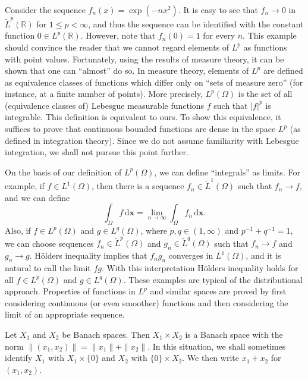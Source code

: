 \begin{Remark}
\label{rem:lp-point-values-and-measure-zero}
Consider the sequence $f_n(x)=\exp(-nx^2)$. It is easy to see that $f_n\to0$ in $\widetilde L^p(\mathbb{R})$ for $1\leq p<\infty$, and thus the sequence can be identified with the constant function $0\in L^p(\mathbb{R})$. However, note that $f_n(0)=1$ for every $n$. This example should convince the reader that we cannot regard elements of $L^p$ as functions with point values. Fortunately, using the results of measure theory, it can be shown that one can ``almost'' do so. In measure theory, elements of $L^p$ are defined as equivalence classes of functions which differ only on ``sets of measure zero'' (for instance, at a finite number of points). More precisely, $L^p(\Omega)$ is the set of all (equivalence classes of) Lebesgue measurable functions $f$ such that $|f|^p$ is integrable. This definition is equivalent to ours. To show this equivalence, it suffices to prove that continuous bounded functions are dense in the space $L^p$ (as defined in integration theory). Since we do not assume familiarity with Lebesgue integration, we shall not pursue this point further.
\end{Remark}

On the basis of our definition of $L^p(\Omega)$, we can define ``integrals'' as limits. For example, if $f\in L^1(\Omega)$, then there is a sequence $f_n\in\widetilde L^1(\Omega)$ such that $f_n\to f$, and we can define
\begin{equation}\label{eq:lp-completion-integral-definition}
\int_\Omega f\,\mathrm{d}\bm{x}=\lim_{n\to\infty}\int_\Omega f_n\,\mathrm{d}\bm{x}.
\end{equation}
Also, if $f\in L^p(\Omega)$ and $g\in L^q(\Omega)$, where $p,q\in(1,\infty)$ and $p^{-1}+q^{-1}=1$, we can choose sequences $f_n\in\widetilde L^p(\Omega)$ and $g_n\in\widetilde L^q(\Omega)$ such that $f_n\to f$ and $g_n\to g$. Hölder\textquotesingle s inequality implies that $f_ng_n$ converges in $L^1(\Omega)$, and it is natural to call the limit $fg$. With this interpretation Hölder\textquotesingle s inequality holds for all $f\in L^p(\Omega)$ and $g\in L^q(\Omega)$. These examples are typical of the distributional approach. Properties of functions in $L^p$ and similar spaces are proved by first considering continuous (or even smoother) functions and then considering the limit of an appropriate sequence.

\begin{Example}
\label{ex:banach-direct-product}
Let $X_1$ and $X_2$ be Banach spaces. Then $X_1\times X_2$ is a Banach space with the norm $\|(x_1,x_2)\|=\|x_1\|+\|x_2\|$. In this situation, we shall sometimes identify $X_1$ with $X_1\times\{0\}$ and $X_2$ with $\{0\}\times X_2$. We then write $x_1+x_2$ for $(x_1,x_2)$.
\end{Example}
